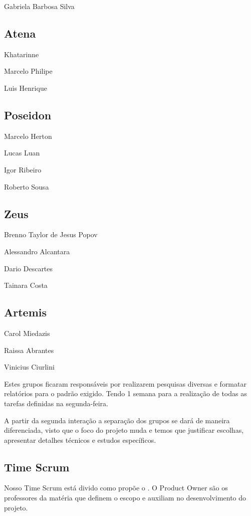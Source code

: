 Gabriela Barbosa Silva


\subsection{Atena}
\label{sub:Atena}

Khatarinne

Marcelo Philipe

Luis Henrique


\subsection{Poseidon}
\label{sub:Poseidon}

Marcelo Herton

Lucas Luan

Igor Ribeiro

Roberto Sousa

\subsection{Zeus}
\label{sub:Zeus}
Brenno Taylor de Jesus Popov

Alessandro Alcantara

Dario Descartes

Tainara Costa

\subsection{Artemis}
\label{sub:Artemis}

Carol Miedazis

Raissa Abrantes

Vinicius Ciurlini

Estes grupos ficaram responsáveis por realizarem pesquisas diversas e formatar relatórios para o padrão
exigido. Tendo 1 semana para a realização de todas as tarefas definidas na segunda-feira.

A partir da segunda interação a separação dos grupos se dará de maneira diferenciada, visto que o
foco do projeto muda e temos que justificar escolhas, apresentar detalhes técnicos e estudos específicos.



\subsection{Time Scrum}
\label{subs:Time Scrum}

Nosso Time Scrum está divido como propõe o \cite{guiaScrum}. O Product Owner são os
professores da matéria que definem o escopo e auxiliam no desenvolvimento do projeto.

